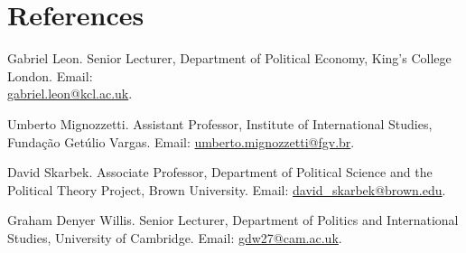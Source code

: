 \documentclass[a4paper]{article}
\renewenvironment{itemize}{
	\begin{list}{}{
			\setlength{\leftmargin}{1.5em}
		}
		}{
	\end{list}
}
\begin{document}
\section*{References}

\begin{itemize}

\item Gabriel Leon. Senior Lecturer, Department of Political Economy, King's College London. Email: \\ \href{mailto:gabriel.leon@kcl.ac.uk}{gabriel.leon@kcl.ac.uk}.
\item Umberto Mignozzetti. Assistant Professor, Institute of International Studies, Funda\c{c}\~{a}o Get\'{u}lio Vargas. Email: \href{umberto.mignozzetti@fgv.br}{umberto.mignozzetti@fgv.br}.
\item David Skarbek. Associate Professor, Department of Political Science and the Political Theory Project, Brown University. Email: \href{mailto:davidskarbek@gmail.com}{david\_skarbek@brown.edu}.
\item Graham Denyer Willis. Senior Lecturer, Department of Politics and International Studies, University of Cambridge. Email: \href{mailto:gdw27@cam.ac.uk}{gdw27@cam.ac.uk}.
\end{itemize}

	\bigskip


	
\end{document}
